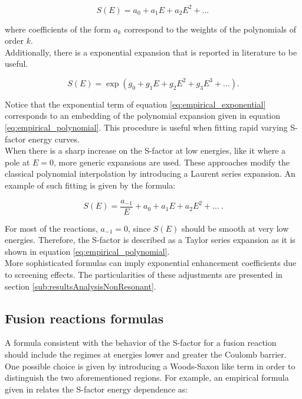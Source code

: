\documentclass[openany]{book}
\begin{document}
\begin{equation}  \label{eq:empirical_polynomial}
	S(E) = a_0 + a_1E + a_2 E^2 + ... \, 
\end{equation}

where coefficients of the form $a_k$ correspond to the weights of the polynomials of order $k$. \\

Additionally,  there is a exponential expansion that is reported in literature to be useful. 

\begin{equation} \label{eq:empirical_exponential}
	S(E) = \exp{(g_0 + g_1E + g_2E^2 + g_3E^3 + ...)}.
\end{equation}

Notice that the exponential term of equation \ref{eq:empirical_exponential} corresponds to an embedding of the polynomial expansion given in equation \ref{eq:empirical_polynomial}. This procedure is useful when fitting rapid varying S-factor energy curves. \\

When there is a sharp increase on the S-factor at low energies, like it where a pole at $E = 0$,  more generic expansions are used. These approaches modify the classical polynomial interpolation by introducing a Laurent series expansion. An example of such fitting is given by the formula: 

\begin{equation}  \label{eq:empirical_laurent}
	S(E) =\frac{ a_{-1}}{E} + a_0 + a_1 E + a_2 E^2 + ... \ .
\end{equation}

For most of the reactions, $a_{-1} = 0$, since $S(E)$ should be smooth at very low energies. Therefore, the S-factor is  described as a Taylor series expansion as it is shown in equation \ref{eq:empirical_polynomial}. \\

More sophisticated formulas can imply exponential enhancement coefficients due to screening effects. The particularities of these adjustments are presented in section \ref{sub:resultsAnalysisNonResonant}. 

\subsection{Fusion reactions formulas} \label{sub:empirical_fusion}

A formula consistent with the behavior of the S-factor for a  fusion reaction should include the regimes at energies lower and greater the Coulomb barrier. One possible choice is given by introducing a Woods-Saxon like term in order to distinguish the two aforementioned regions. For example, an empirical formula given in  \cite{beard_afanasjev_chamon_gasques_wiescher_yakovlev_2010} relates the S-factor energy dependence as:
\end{document}
